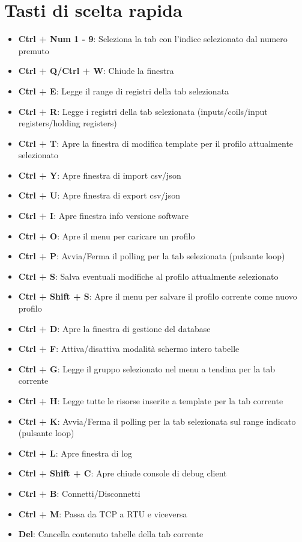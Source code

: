 
\chapter{Tasti di scelta rapida}

\begin{itemize}
\item \textbf{Ctrl + Num 1 - 9}: Seleziona la tab con l'indice selezionato dal numero premuto
\item \textbf{Ctrl + Q/Ctrl + W}: Chiude la finestra
\item \textbf{Ctrl + E}: Legge il range di registri della tab selezionata
\item \textbf{Ctrl + R}: Legge i registri della tab selezionata (inputs/coils/input registers/holding registers)
\item \textbf{Ctrl + T}: Apre la finestra di modifica template per il profilo attualmente selezionato
\item \textbf{Ctrl + Y}: Apre finestra di import csv/json
\item \textbf{Ctrl + U}: Apre finestra di export csv/json
\item \textbf{Ctrl + I}: Apre finestra info versione software
\item \textbf{Ctrl + O}: Apre il menu per caricare un profilo
\item \textbf{Ctrl + P}: Avvia/Ferma il polling per la tab selezionata (pulsante loop)
\item \textbf{Ctrl + S}: Salva eventuali modifiche al profilo attualmente selezionato
\item \textbf{Ctrl + Shift + S}: Apre il menu per salvare il profilo corrente come nuovo profilo
\item \textbf{Ctrl + D}: Apre la finestra di gestione del database
\item \textbf{Ctrl + F}: Attiva/disattiva modalità schermo intero tabelle
\item \textbf{Ctrl + G}: Legge il gruppo selezionato nel menu a tendina per la tab corrente
\item \textbf{Ctrl + H}: Legge tutte le risorse inserite a template per la tab corrente
\item \textbf{Ctrl + K}: Avvia/Ferma il polling per la tab selezionata sul range indicato (pulsante loop)
\item \textbf{Ctrl + L}: Apre finestra di log
\item \textbf{Ctrl + Shift + C}: Apre chiude console di debug client
\item \textbf{Ctrl + B}: Connetti/Disconnetti
\item \textbf{Ctrl + M}: Passa da TCP a RTU e viceversa
\item \textbf{Del}: Cancella contenuto tabelle della tab corrente
\end{itemize}